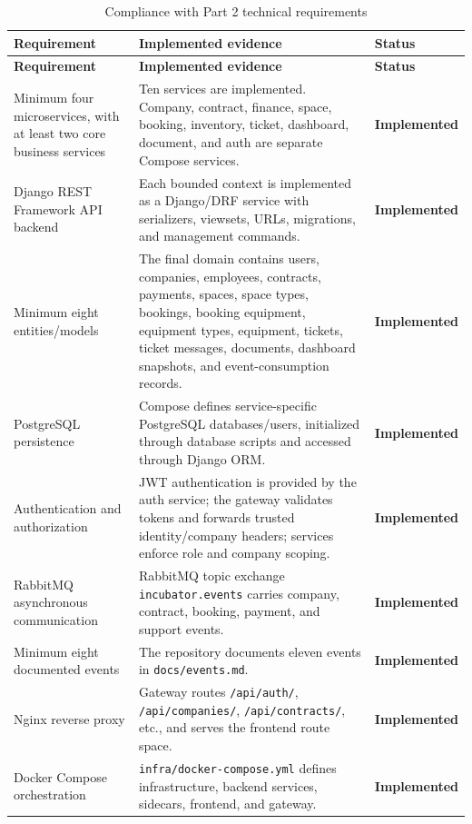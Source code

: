 \documentclass[12pt,a4paper]{report}
\newcommand{\implemented}{\textcolor{successgreen}{\textbf{Implemented}}}
\begin{document}
\begin{longtable}{L{0.32\textwidth}L{0.48\textwidth}C{0.13\textwidth}}
\caption{Compliance with Part 2 technical requirements}\label{tab:course-compliance}\\
\toprule
\textbf{Requirement} & \textbf{Implemented evidence} & \textbf{Status} \\
\midrule
\endfirsthead
\toprule
\textbf{Requirement} & \textbf{Implemented evidence} & \textbf{Status} \\
\midrule
\endhead
Minimum four microservices, with at least two core business services & Ten services are implemented. Company, contract, finance, space, booking, inventory, ticket, dashboard, document, and auth are separate Compose services. & \implemented \\
Django REST Framework API backend & Each bounded context is implemented as a Django/DRF service with serializers, viewsets, URLs, migrations, and management commands. & \implemented \\
Minimum eight entities/models & The final domain contains users, companies, employees, contracts, payments, spaces, space types, bookings, booking equipment, equipment types, equipment, tickets, ticket messages, documents, dashboard snapshots, and event-consumption records. & \implemented \\
PostgreSQL persistence & Compose defines service-specific PostgreSQL databases/users, initialized through database scripts and accessed through Django ORM. & \implemented \\
Authentication and authorization & JWT authentication is provided by the auth service; the gateway validates tokens and forwards trusted identity/company headers; services enforce role and company scoping. & \implemented \\
RabbitMQ asynchronous communication & RabbitMQ topic exchange \texttt{incubator.events} carries company, contract, booking, payment, and support events. & \implemented \\
Minimum eight documented events & The repository documents eleven events in \texttt{docs/events.md}. & \implemented \\
Nginx reverse proxy & Gateway routes \texttt{/api/auth/}, \texttt{/api/companies/}, \texttt{/api/contracts/}, etc., and serves the frontend route space. & \implemented \\
Docker Compose orchestration & \texttt{infra/docker-compose.yml} defines infrastructure, backend services, sidecars, frontend, and gateway. & \implemented \\

\end{longtable}
\end{document}
